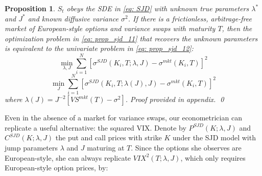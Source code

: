 \documentclass[12pt]{article}
\newtheorem{proposition}{Proposition}
\begin{document}
\begin{proposition}\label{prop: SJD_VS} 
$S_t$ obeys the SDE in \eqref{eq: SJD} with unknown true parameters $\lambda^*$ and $J^*$ and known diffusive variance $\sigma^2$. If there is a frictionless, arbitrage-free market of European-style options and variance swaps with maturity $T$, then the optimization problem in \eqref{eq: prop_sjd_11} that recovers the unknown parameters is equivalent to the univariate problem in \eqref{eq: prop_sjd_12}:
\begin{equation}\label{eq: prop_sjd_11}
  \min\limits_{\lambda, J}  \sum\limits_{i=1}^N \left[\sigma^{SJD}(K_i, T; \lambda, J) - \sigma^{mkt}(K_i, T)\right]^2 
\end{equation}
\begin{equation}\label{eq: prop_sjd_12}
  \min\limits_{J} \sum\limits_{i=1}^N \left[\sigma^{SJD}(K_i, T; \lambda(J), J) - \sigma^{mkt}(K_i, T)\right]^2 
\end{equation}
where $\lambda(J) = J^{-2}\left[VS^{mkt}(T) - \sigma^2\right]$. Proof provided in appendix.
\qed
\end{proposition}


Even in the absence of a market for variance swaps, our econometrician can replicate a useful alternative: the squared VIX. Denote by $P^{SJD}(K; \lambda, J)$ and $C^{SJD}(K; \lambda, J)$ the put and call prices with strike $K$ under the SJD model with jump parameters $\lambda$ and $J$ maturing at $T$. Since the options she observes are European-style, she can always replicate $VIX^2(T; \lambda, J)$, which only requires European-style option prices, by:
\end{document}
